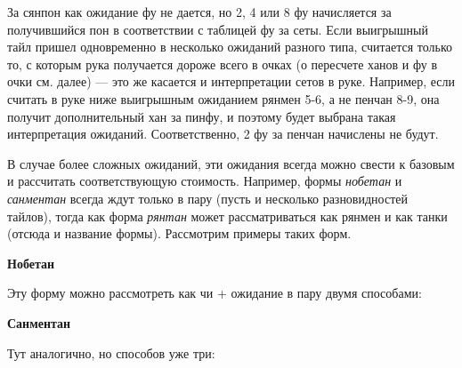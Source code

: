 За сянпон как ожидание фу не дается, но 2, 4 или 8 фу начисляется за получившийся пон в соответствии с таблицей фу за сеты. Если выигрышный тайл пришел одновременно в несколько ожиданий разного типа, считается только то, с которым рука получается дороже всего в очках (о пересчете ханов и фу в очки см. далее) --- это же касается и интерпретации сетов в руке. Например, если считать в руке ниже выигрышным ожиданием рянмен 5-6, а не пенчан 8-9, она получит дополнительный хан за  пинфу,  и поэтому будет выбрана такая интерпретация ожиданий. Соответственно, 2 фу за пенчан начислены не будут.


\begin{additional}
	
В случае более сложных ожиданий, эти ожидания всегда можно свести к базовым и рассчитать соответствующую стоимость. Например, формы \textit{нобетан} и \textit{санментан} всегда ждут только в пару (пусть и несколько разновидностей тайлов), тогда как форма \textit{рянтан} может рассматриваться как рянмен и как танки (отсюда и название формы). Рассмотрим примеры таких форм.

\vspace{0.3cm}
\textbf{Нобетан}
\vspace{0.3cm}


\vspace{0.3cm}

Эту форму можно рассмотреть как чи + ожидание в пару двумя способами:

\vspace{0.3cm}

\vspace{0.3cm}

\vspace{0.3cm}
\textbf{Санментан}
\vspace{0.3cm}


\vspace{0.3cm}
Тут аналогично, но способов уже три:

\vspace{0.3cm}

\vspace{0.3cm}

\vspace{0.3cm}


\end{additional}
